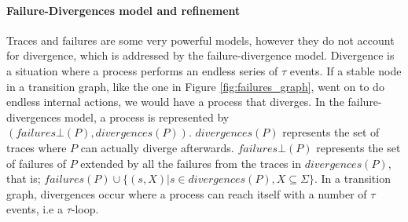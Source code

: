 \paragraph{Failure-Divergences model and refinement}
Traces and failures are some very powerful models, however they do not account for divergence, which is addressed by the failure-divergence model. Divergence is a situation where a process performs an endless series of $\tau$ events. If a stable node in a transition graph, like the one in Figure \ref{fig:failures_graph}, went on to do endless internal actions, we would have a process that diverges. In the failure-divergences model, a process is represented by $(failures\bot(P), divergences(P))$. $divergences(P)$ represents the set of traces where $P$ can actually diverge afterwards. $failures\bot(P)$ represents the set of failures of $P$ extended by all the failures from the traces in $divergences(P)$, that is; $failures(P) \cup \{(s,X) | s \in divergences(P), X \subseteq \Sigma\}$.
In a transition graph, divergences occur where a process can reach itself with a number of $\tau$ events, i.e a $\tau$-loop.




